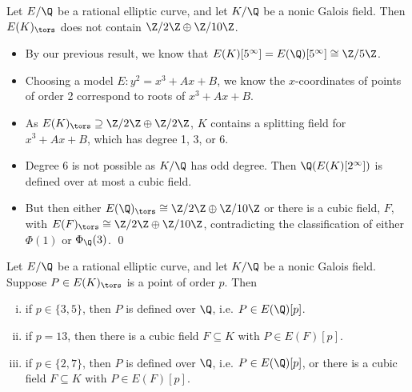 \begin{frame}[plain]
\footnotesize
\begin{lem}
Let $E/\Q$ be a rational elliptic curve, and let $K/\Q$ be a nonic Galois field. Then $E(K)_\tors$ does not contain $\Z/2\Z \oplus \Z/10\Z$.
\end{lem} \pspace

\pf
\begin{itemize}
\item By our previous result, we know that $E(K)[5^\infty]= E(\Q)[5^\infty] \cong \Z/5\Z$. 
\item Choosing a model $E: y^2= x^3 + Ax + B$, we know the $x$-coordinates of points of order 2 correspond to roots of $x^3 + Ax + B$. 
\item As $E(K)_\tors \supseteq \Z/2\Z \oplus \Z/2\Z$, $K$ contains a splitting field for $x^3 + Ax + B$, which has degree 1, 3, or 6. 
\item Degree 6 is not possible as $K/\Q$ has odd degree. Then $\Q(E(K)[2^\infty])$ is defined over at most a cubic field. 
\item But then either $E(\Q)_\tors \cong \Z/2\Z \oplus \Z/10\Z$ or there is a cubic field, $F$, with $E(F)_\tors \cong \Z/2\Z \oplus \Z/10\Z$, contradicting the classification of either $\Phi(1)$ or $\Phi_\Q(3)$. \hfill\qed
\end{itemize}
\end{frame}





\begin{frame}[plain]
\begin{prop}
Let $E/\Q$ be a rational elliptic curve, and let $K/\Q$ be a nonic Galois field. Suppose $P \in E(K)_\tors$ is a point of order $p$. Then
        \begin{enumerate}[(i)]
        \item if $p \in \{ 3, 5 \}$, then $P$ is defined over $\Q$, i.e. $P \in E(\Q)[p]$.
        \item if $p= 13$, then there is a cubic field $F \subseteq K$ with $P \in E(F)[p]$. 
        \item if $p \in \{ 2, 7 \}$, then $P$ is defined over $\Q$, i.e. $P \in E(\Q)[p]$, or there is a cubic field $F \subseteq K$ with $P \in E(F)[p]$. 
        \end{enumerate}
\end{prop}
\end{frame}





